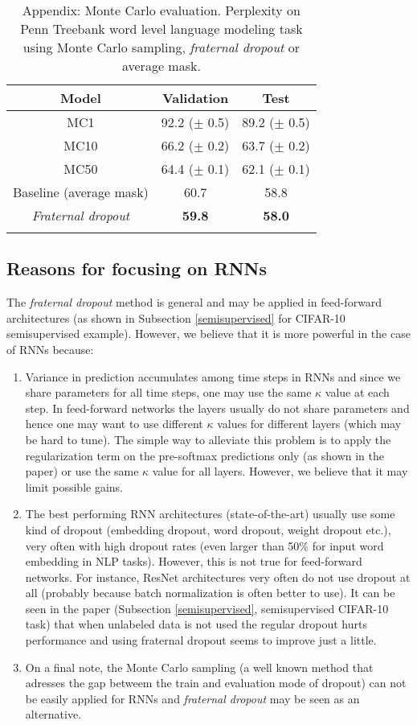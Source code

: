 \documentclass{article} \usepackage{iclr2018_conference,times}
\begin{document}
\begin{table}[ht]
\vspace{-0.08cm}
\centering
\begin{tabular}{c | c c} 
\textbf{Model} & \textbf{Validation} & \textbf{Test}\\
\hline
MC1 & 92.2 ($\pm$ 0.5) & 89.2 ($\pm$ 0.5)\\
MC10 & 66.2 ($\pm$ 0.2) & 63.7 ($\pm$ 0.2)\\
MC50 & 64.4 ($\pm$ 0.1) & 62.1 ($\pm$ 0.1)\\
Baseline (average mask) & 60.7 & 58.8\\
\emph{Fraternal dropout} & \textbf{59.8} & \textbf{58.0}\\
\vspace{-0.08cm}
\end{tabular}
\caption{Appendix: Monte Carlo evaluation. Perplexity on Penn Treebank word level language modeling task using Monte Carlo sampling, \emph{fraternal dropout} or average mask.}
\label{table:MC-eval}
\end{table}

\newpage
\subsection*{Reasons for focusing on RNNs}
The \emph{fraternal dropout} method is general and may be applied in feed-forward architectures (as shown in Subsection \ref{semisupervised} for CIFAR-10 semisupervised example). However, we believe that it is more powerful in the case of RNNs because:
\begin{enumerate}
\item Variance in prediction accumulates among time steps in RNNs and since we share parameters for all time steps, one may use the same $\kappa$ value at each step. In feed-forward networks the layers usually do not share parameters and hence one may want to use different $\kappa$  values for different layers (which may be hard to tune). The simple way to alleviate this problem is to apply the regularization term on the pre-softmax predictions only (as shown in the paper) or use the same $\kappa$  value for all layers. However, we believe that it may limit possible gains.
\item The best performing RNN architectures (state-of-the-art) usually use some kind of dropout (embedding dropout, word dropout, weight dropout etc.), very often with high dropout rates (even larger than 50\% for input word embedding in NLP tasks). However, this is not true for feed-forward networks. For instance, ResNet architectures very often do not use dropout at all (probably because batch normalization is often better to use). It can be seen in the paper (Subsection \ref{semisupervised}, semisupervised CIFAR-10 task) that when unlabeled data is not used the regular dropout hurts performance and using fraternal dropout seems to improve just a little.
\item On a final note, the Monte Carlo sampling (a well known method that adresses the gap betweem the train and evaluation mode of dropout) can not be easily applied for RNNs and \emph{fraternal dropout} may be seen as an alternative.
\end{enumerate}
\end{document}
